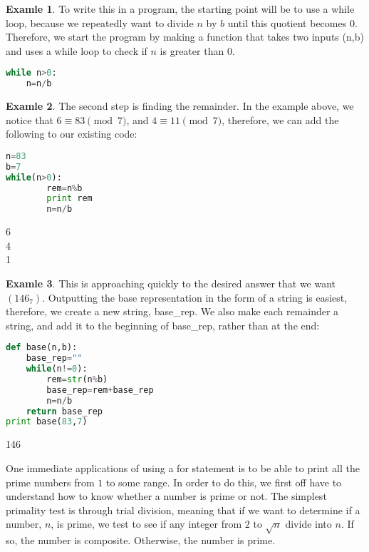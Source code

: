 \documentclass[12pt,openany]{book} %
\theoremstyle{definition}
\newtheorem{soln}{\textbf{Exam\smash{p}le} \nolinebreak }[section]
\newcounter{code}[section]
\begin{document}
\begin{soln}  To write this in a program, the starting point will be to use a while loop, because we repeatedly want to divide $n$ by $b$ until this quotient becomes $0$.  Therefore, we start the program by making a function that takes two inputs (n,b) and uses a while loop to check if $n$ is greater than $0$.  \end{soln}   
\begin{code}{}{}
\begin{lstlisting}[language=Python]
while n>0:
	n=n/b
\end{lstlisting}   \end{code}
\begin{soln}  
The second step is finding the remainder.  In the example above, we notice that $6\equiv 83\pmod7$, and $4\equiv 11\pmod7$, therefore, we can add the following to our existing code:   \end{soln}  
\begin{code}{}{}
\begin{lstlisting}[language=Python]
n=83
b=7
while(n>0):
        rem=n%b
        print rem
        n=n/b
\end{lstlisting} \end{code}
\begin{out}{}{} 6 \\ 4 \\ 1 \end{out}
\begin{soln}  
This is approaching quickly to the desired answer that we want $(146_7)$.  Outputting the base representation in the form of a string is easiest, therefore, we create a new string, base\_rep.  We also make each remainder a string, and add it to the beginning of base\_rep, rather than at the end:  \end{soln}  
\begin{code}{}{}
\begin{lstlisting}[language=Python]
def base(n,b):
	base_rep=""
	while(n!=0):
		rem=str(n%b)
		base_rep=rem+base_rep
		n=n/b
	return base_rep
print base(83,7)
\end{lstlisting} \end{code}
\begin{out}{}{} 146 \end{out} 
One immediate applications of using a for statement is to be able to print all the prime numbers from $1$ to some range.  In order to do this, we first off have to understand how to know whether a number is prime or not.  The simplest primality test is through trial division, meaning that if we want to determine if a number, $n$, is prime, we test to see if any integer from $2$ to $\sqrt{n}$ divide into $n$.  If so, the number is composite. Otherwise, the number is prime.    
\end{document}
